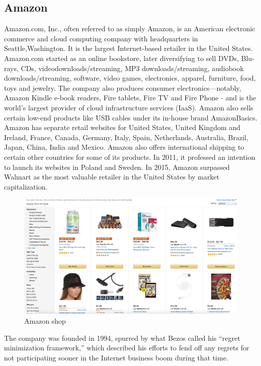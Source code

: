 \subsection{Amazon}
Amazon.com, Inc., often referred to as simply Amazon, is an American electronic commerce and cloud computing company with headquarters in Seattle,Washington. It is the largest Internet-based retailer in the United States. Amazon.com started as an online bookstore, later diversifying to sell DVDs, Blu-rays, CDs, videodownloads/streaming, MP3 downloads/streaming, audiobook downloads/streaming, software, video games, electronics, apparel, furniture, food, toys and jewelry. The company also produces consumer electronics—notably, Amazon Kindle e-book readers, Fire tablets, Fire TV and Fire Phone - and is the world's largest provider of cloud infrastructure services (IaaS). Amazon also sells certain low-end products like USB cables under its in-house brand AmazonBasics.
\newline
Amazon has separate retail websites for United States, United Kingdom and Ireland, France, Canada, Germany, Italy, Spain, Netherlands, Australia, Brazil, Japan, China, India and Mexico.
\newline
Amazon also offers international shipping to certain other countries for some of its products. In 2011, it professed an intention to launch its websites in Poland and Sweden.
In 2015, Amazon surpassed Walmart as the most valuable retailer in the United States by market capitalization.
\begin{figure}[htb]
 \centering
 \includegraphics[width=1.0\linewidth]{images/chapter1/ex-amazon.png}\hfill
 \caption[Amazon shop]{Amazon shop}
 \label{fig:e_commerce_amazon_shop}
\end{figure}
The company was founded in 1994, spurred by what Bezos called his “regret minimization framework,” which described his efforts to fend off any regrets for not participating sooner in the Internet business boom during that time.
